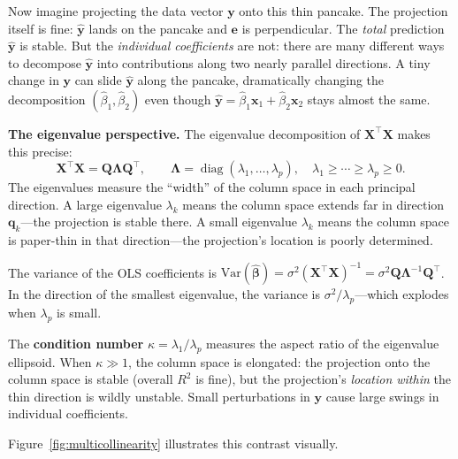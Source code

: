 \documentclass[11pt,a4paper]{article}
\theoremstyle{plain}
\theoremstyle{definition}
\newcommand{\yhat}{\hat{\bm{y}}}
\newcommand{\bhat}{\hat{\bm{\beta}}}
\newcommand{\bX}{\bm{X}}
\newcommand{\by}{\bm{y}}
\newcommand{\be}{\bm{e}}
\newcommand{\bQ}{\bm{Q}}
\DeclareMathOperator{\diag}{diag}
\begin{document}
Now imagine projecting the data vector $\by$ onto this thin pancake.
The projection itself is fine: $\yhat$ lands on the pancake and $\be$ is perpendicular.
The \emph{total} prediction $\yhat$ is stable.
But the \emph{individual coefficients} are not: there are many different ways to decompose $\yhat$ into contributions along two nearly parallel directions.
A tiny change in $\by$ can slide $\yhat$ along the pancake, dramatically changing the decomposition $(\hat{\beta}_1, \hat{\beta}_2)$ even though $\yhat = \hat{\beta}_1\bm{x}_1 + \hat{\beta}_2\bm{x}_2$ stays almost the same.

\medskip
\noindent\textbf{The eigenvalue perspective.}
The eigenvalue decomposition of $\bX^\top\bX$ makes this precise:
\[
  \bX^\top\bX = \bQ\bm{\Lambda}\bQ^\top,
  \qquad
  \bm{\Lambda} = \diag(\lambda_1,\dots,\lambda_p),
  \quad \lambda_1\ge\cdots\ge\lambda_p\ge 0.
\]
The eigenvalues measure the ``width'' of the column space in each principal direction.
A large eigenvalue $\lambda_k$ means the column space extends far in direction $\bm{q}_k$---the projection is stable there.
A small eigenvalue $\lambda_k$ means the column space is paper-thin in that direction---the projection's location is poorly determined.

The variance of the OLS coefficients is $\text{Var}(\bhat) = \sigma^2(\bX^\top\bX)^{-1} = \sigma^2\bQ\bm{\Lambda}^{-1}\bQ^\top$.
In the direction of the smallest eigenvalue, the variance is $\sigma^2/\lambda_p$---which explodes when $\lambda_p$ is small.

The \textbf{condition number} $\kappa = \lambda_1/\lambda_p$
measures the aspect ratio of the eigenvalue ellipsoid.
When $\kappa \gg 1$, the column space is elongated: the projection
onto the column space is stable (overall $R^2$ is fine), but the
projection's \emph{location within} the thin direction is wildly
unstable. Small perturbations in $\by$ cause large swings
in individual coefficients.

Figure~\ref{fig:multicollinearity} illustrates this contrast visually.

\end{document}
